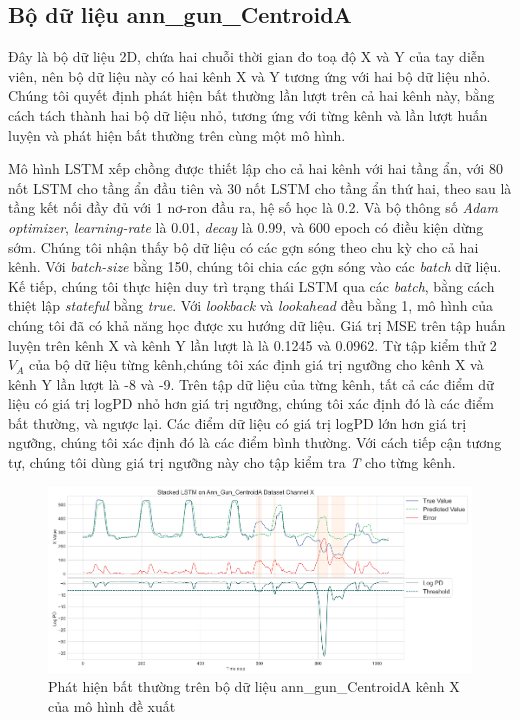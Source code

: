 \subsection{Bộ dữ liệu ann\_gun\_CentroidA}
Đây là bộ dữ liệu 2D, chứa hai chuỗi thời gian đo toạ độ X và Y của tay diễn viên, nên bộ dữ liệu này có hai kênh X và Y tương ứng với hai bộ dữ liệu nhỏ. Chúng tôi quyết định phát hiện bất thường lần lượt trên cả hai kênh này, bằng cách tách thành hai bộ dữ liệu nhỏ, tương ứng với từng kênh và lần lượt huấn luyện và phát hiện bất thường trên cùng một mô hình.

Mô hình LSTM xếp chồng được thiết lập cho cả hai kênh với hai tầng ẩn, với 80 nốt LSTM cho tầng ẩn đầu tiên và 30 nốt LSTM cho tầng ẩn thứ hai, theo sau là tầng kết nối đầy đủ với 1 nơ-ron đầu ra, hệ số học là 0.2. Và bộ thông số \textit{Adam optimizer}, \textit{learning-rate} là 0.01, \textit{decay} là 0.99, và 600 epoch có điều kiện dừng sớm. Chúng tôi nhận thấy bộ dữ liệu có các gợn sóng theo chu kỳ cho cả hai kênh. Với \textit{batch-size} bằng 150, chúng tôi chia các gợn sóng vào các \textit{batch} dữ liệu. Kế tiếp, chúng tôi thực hiện duy trì trạng thái LSTM qua các \textit{batch}, bằng cách thiệt lập \textit{stateful} bằng \textit{true}. Với \textit{lookback} và \textit{lookahead} đều bằng 1, mô hình của chúng tôi đã có khả năng học được xu hướng dữ liệu. Giá trị MSE trên tập huấn luyện trên kênh X và kênh Y lần lượt là là 0.1245 và 0.0962. Từ tập kiểm thử 2 $V_{A}$ của bộ dữ liệu từng kênh,chúng tôi xác định giá trị ngưỡng cho kênh X và kênh Y lần lượt là -8 và -9. Trên tập dữ liệu của từng kênh, tất cả các điểm dữ liệu có giá trị logPD nhỏ hơn giá trị ngưỡng, chúng tôi xác định đó là các điểm bất thường, và ngược lại. Các điểm dữ liệu có giá trị logPD lớn hơn giá trị ngưỡng, chúng tôi xác định đó là các điểm bình thường. Với cách tiếp cận tương tự, chúng tôi dùng giá trị ngưỡng này cho tập kiểm tra \textit{T} cho từng kênh.

\begin{figure}[H]
    \centering
    \includegraphics[scale=1]{./content/images/5-15.png}
    \caption{Phát hiện bất thường trên bộ dữ liệu ann\_gun\_CentroidA kênh X của mô hình đề xuất}
    \label{fig:5-15}
\end{figure}

